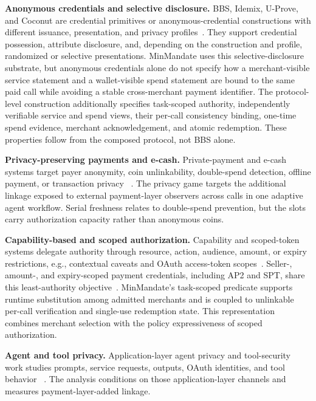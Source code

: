 \documentclass[letterpaper]{article}
\newcommand{\system}{MinMandate\xspace}
\begin{document}
\ifdefined\MMAAAITwoColumn
  \MMRelatedWorkPositioningTable
\fi

\textbf{Anonymous credentials and selective disclosure.}
BBS, Idemix, U-Prove, and Coconut are credential primitives or
anonymous-credential constructions with different issuance, presentation, and
privacy profiles~\cite{cfrgbbs2026,camenisch2002design,idemix2002,uprovespec,coconut2019}.
They support credential possession, attribute disclosure, and, depending on
the construction and profile, randomized or selective presentations.  \system
uses this selective-disclosure substrate, but anonymous credentials alone do
not specify how a merchant-visible
service statement and a wallet-visible spend statement are bound to the same
paid call while avoiding a stable cross-merchant payment identifier.  The
protocol-level construction additionally specifies task-scoped authority,
independently verifiable service and spend views, their per-call consistency
binding, one-time spend evidence, merchant acknowledgement, and atomic
redemption.  These properties follow from the composed protocol, not BBS
alone.

\textbf{Privacy-preserving payments and e-cash.}
Private-payment and e-cash systems target payer anonymity, coin unlinkability,
double-spend detection, offline payment, or transaction privacy
~\cite{chaum1983blind,chaum1988offline,sasson2014zerocash}.
The privacy game targets the additional linkage exposed to external
payment-layer observers
across calls in one adaptive agent workflow.  Serial freshness relates to
double-spend prevention, but the slots carry authorization capacity rather than
anonymous coins.

\textbf{Capability-based and scoped authorization.}
Capability and scoped-token systems delegate authority through resource,
action, audience, amount, or expiry restrictions, e.g., contextual caveats and
OAuth access-token scopes~\cite{birgisson2014macaroons,rfc6749}.  Seller-,
amount-, and expiry-scoped payment credentials, including AP2 and SPT, share
this least-authority objective~\cite{ap2docs,stripe2026spt}.
\system's task-scoped predicate supports runtime substitution
among admitted merchants and is coupled to unlinkable per-call verification
and single-use redemption state. This representation combines merchant
selection with the policy expressiveness of scoped authorization.

\ifdefined\MMAAAITwoColumn
\else
  \MMRelatedWorkPositioningTable
\fi

\textbf{Agent and tool privacy.}
Application-layer agent privacy and tool-security work studies prompts,
service requests, outputs, OAuth identities, and tool behavior
~\cite{ruan2024toolemu,debenedetti2024agentdojo,wang2026mpma,wang2026mcptox,shao2024privacylens,lin2026sapa,zhan2025portcullis}.
The analysis conditions on those application-layer channels and measures
payment-layer-added linkage.


\FloatBarrier
\clearpage
\begingroup
{}

\endgroup
\end{document}
